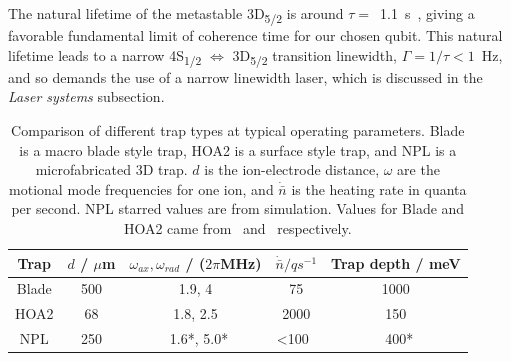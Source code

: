 \documentclass[12pt]{iopart}
\begin{document}

The natural lifetime of the metastable 3D\textsubscript{5/2} is around
$\tau =$~1.1~s~\cite{barton_measurement_2000}, giving a favorable fundamental limit of coherence
time for our chosen qubit.  This natural lifetime leads to a narrow
4S\textsubscript{1/2} $\Leftrightarrow$ 3D\textsubscript{5/2}
transition linewidth, $\Gamma = 1/\tau < 1$~Hz, and so demands the use of a
narrow linewidth laser, which is discussed in the \textit{Laser
  systems} subsection.

\begin{table}[h!]
\begin{center}
\begin{tabular}{ c|c c c c }
  Trap & $d$ / $\mu$m & $\omega_{ax}, \omega_{rad}$ / ($2\pi$MHz) & $\dot{\bar{n}} / qs^{-1}$ & Trap depth / meV \\ 
  \hline
  Blade  & 500 & 1.9, 4 & 75 & 1000 \\
  HOA2  & 68 & 1.8, 2.5 & 2000 & 150 \\
  NPL  & 250 & ~1.6*, 5.0* & <100~ & ~400* 
\end{tabular}
\caption{Comparison of different trap types at typical operating
  parameters. Blade is a macro blade style trap, HOA2 is a surface
  style trap, and NPL is a microfabricated 3D trap. $d$ is the
  ion-electrode distance, $\omega$ are the motional mode frequencies
  for one ion, and $\dot{\bar{n}}$ is the heating rate in quanta per
  second. NPL starred values are from simulation. Values for Blade and
  HOA2 came from~\cite{shafer_fast_2020, hughes_benchmarking_2021} and~\cite{nadlinger_device_2023, nichols_thesis_2023}
  respectively. }
\label{table:trap}

\end{center}
\end{table}
\end{document}
